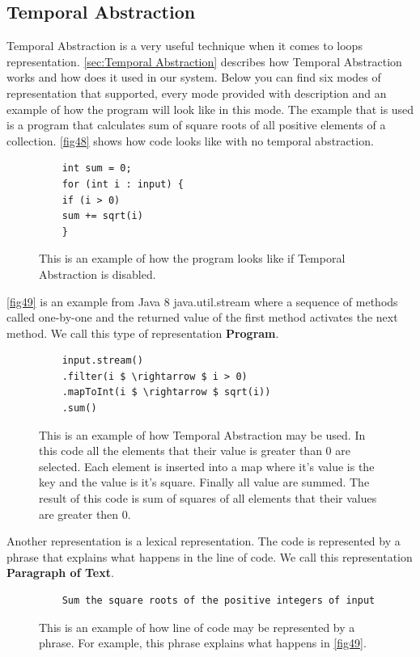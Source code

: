 \subsection{Temporal Abstraction}
Temporal Abstraction is a very useful technique when it comes to loops representation. \autoref{sec:Temporal Abstraction} describes how Temporal Abstraction works and how does it used in our system. Below you can find six modes of representation that supported, every mode provided with description and an example of how the program will look like in this mode. The example that is used is a program that calculates sum of square roots of all positive elements of a collection.
\autoref{fig48} shows how code looks like with no temporal abstraction.
\begin{figure}[H]
	\begin{lstlisting}
	int sum = 0;
	for (int i : input) {
	if (i > 0)
	sum += sqrt(i)
	}
	\end{lstlisting}
	\caption{This is an example of how the program looks like if Temporal Abstraction is disabled.}
	\label{fig48}
\end{figure}
\autoref{fig49} is an example from Java 8 java.util.stream where a sequence of methods called one-by-one and the returned value of the first method activates the next method. We call this type of representation \textbf{Program}.
\begin{figure}[H]
	\begin{lstlisting}
	input.stream()
	.filter(i $ \rightarrow $ i > 0)
	.mapToInt(i $ \rightarrow $ sqrt(i))
	.sum()
	\end{lstlisting}
	\caption{This is an example of how Temporal Abstraction may be used. In this code all the elements that their value is greater than 0 are selected. Each element is inserted into a map where it's value is the key and the value is it's square. Finally all value are summed. The result of this code is sum of squares of all elements that their values are greater then 0.}
	\label{fig49}
\end{figure}
Another representation is a lexical representation. The code is represented by a phrase that explains what happens in the line of code. We call this representation \textbf{Paragraph of Text}.
\begin{figure}[H]
	\begin{lstlisting}
	Sum the square roots of the positive integers of input
	\end{lstlisting}
	\caption{This is an example of how line of code may be represented by a phrase. For example, this phrase explains what happens in \autoref{fig49}.}
	\label{fig50}
\end{figure}
